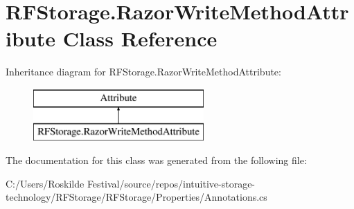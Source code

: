 \section{R\+F\+Storage.\+Razor\+Write\+Method\+Attribute Class Reference}
\label{class_r_f_storage_1_1_razor_write_method_attribute}
Inheritance diagram for R\+F\+Storage.\+Razor\+Write\+Method\+Attribute\+:\begin{figure}[H]
\begin{center}
\leavevmode
\includegraphics[height=2.000000cm]{class_r_f_storage_1_1_razor_write_method_attribute}
\end{center}
\end{figure}


The documentation for this class was generated from the following file\+:\begin{DoxyCompactItemize}
\item 
C\+:/\+Users/\+Roskilde Festival/source/repos/intuitive-\/storage-\/technology/\+R\+F\+Storage/\+R\+F\+Storage/\+Properties/Annotations.\+cs\end{DoxyCompactItemize}
